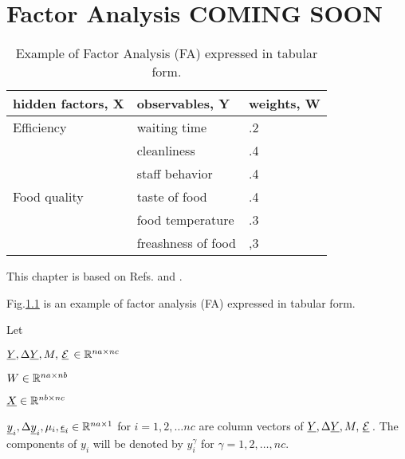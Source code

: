 \chapter{Factor Analysis COMING SOON}
\label{ch-factor-ana}


\begin{table}[h!]
\begin{tabular}{|l|l|l|}
\hline
hidden factors, X                          & observables, Y                                & weights, W \\ \hline
\cellcolor[HTML]{F4B9FB}Efficiency   & \cellcolor[HTML]{F4B9FB}waiting time       & .2         \\ \cline{2-3} 
\cellcolor[HTML]{F4B9FB}             & \cellcolor[HTML]{F4B9FB}cleanliness        & .4         \\ \cline{2-3} 
\cellcolor[HTML]{F4B9FB}             & \cellcolor[HTML]{F4B9FB}staff behavior     & .4         \\ \hline
\cellcolor[HTML]{B8FFDA}Food quality & \cellcolor[HTML]{B8FFDA}taste of food      & .4         \\ \cline{2-3} 
\cellcolor[HTML]{B8FFDA}             & \cellcolor[HTML]{B8FFDA}food temperature   & .3         \\ \cline{2-3} 
\cellcolor[HTML]{B8FFDA}             & \cellcolor[HTML]{B8FFDA}freashness of food & ,3         \\ \hline
\end{tabular}
\caption{Example of Factor Analysis (FA) expressed in tabular form.}
\label{tab-factor-ana}
\end{table}



This chapter is based on Refs.\cite{wiki-factor-ana} and
\cite{tipping-bishop}.

Fig.\ref{tab-factor-ana} is an example
of factor analysis (FA)
expressed in tabular form.

Let

${\underline{Y}}, \Delta{\underline{Y}}, M, {\,\underline{{\cal E}}\,}\in { \mathbb{R}}^{na\times nc}$

$W\in { \mathbb{R}}^{na\times nb}$

${\underline{X}} \in  { \mathbb{R}}^{nb\times nc}$

${\underline{y}}_i, \Delta{\underline{y}}_i, \mu_i, \underline{\epsilon}_i\in { \mathbb{R}}^{na\times 1}$ for $i=1, 2, \ldots nc$ are column vectors of ${\underline{Y}}, \Delta {\underline{Y}}, M, {\,\underline{{\cal E}}\,}$.
The components of $y_i$ will be denoted by $y_i^\gamma$ for $\gamma=1,2, \ldots, nc$.

